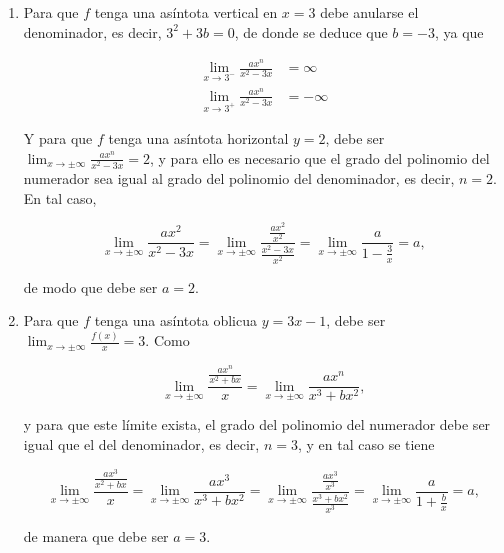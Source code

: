 \documentclass[
  spanish,
  a4paper,
]{scrreport}
\theoremstyle{definition}
\theoremstyle{remark}
\begin{document}
\begin{tcolorbox}[enhanced jigsaw, arc=.35mm, bottomrule=.15mm, bottomtitle=1mm, breakable, colback=white, colbacktitle=quarto-callout-tip-color!10!white, colframe=quarto-callout-tip-color-frame, coltitle=black, left=2mm, leftrule=.75mm, opacityback=0, opacitybacktitle=0.6, rightrule=.15mm, title=\textcolor{quarto-callout-tip-color}{\faLightbulb}\hspace{0.5em}{Solución}, titlerule=0mm, toprule=.15mm, toptitle=1mm]

\begin{enumerate}
\def\labelenumi{\alph{enumi}.}
\item
  Para que \(f\) tenga una asíntota vertical en \(x=3\) debe anularse el
  denominador, es decir, \(3^2+3b=0\), de donde se deduce que \(b=-3\),
  ya que

  \begin{align*}
  \lim_{x\to 3^-}\frac{ax^n}{x^2-3x}  
  &= \infty \\
  \lim_{x\to 3^+}\frac{ax^n}{x^2-3x}  
  &= -\infty
  \end{align*}

  Y para que \(f\) tenga una asíntota horizontal \(y=2\), debe ser
  \(\lim_{x\to \pm\infty} \frac{ax^n}{x^2-3x} = 2\), y para ello es
  necesario que el grado del polinomio del numerador sea igual al grado
  del polinomio del denominador, es decir, \(n=2\). En tal caso,

  \[
  \lim_{x\to \pm\infty} \frac{ax^2}{x^2-3x}
  = \lim_{x\to \pm\infty} \frac{\frac{ax^2}{x^2}}{\frac{x^2-3x}{x^2}}
  = \lim_{x\to \pm\infty} \frac{a}{1-\frac{3}{x}} 
  = a,
  \]

  de modo que debe ser \(a=2\).
\item
  Para que \(f\) tenga una asíntota oblicua \(y=3x-1\), debe ser
  \(\lim_{x\to\pm\infty} \frac{f(x)}{x}=3\). Como

  \[
  \lim_{x\to\pm\infty} \frac{\frac{ax^n}{x^2+bx}}{x} 
  = \lim_{x\to\pm\infty} \frac{ax^n}{x^3+bx^2},
  \]

  y para que este límite exista, el grado del polinomio del numerador
  debe ser igual que el del denominador, es decir, \(n=3\), y en tal
  caso se tiene

  \[
  \lim_{x\to\pm\infty} \frac{\frac{ax^3}{x^2+bx}}{x} 
  = \lim_{x\to\pm\infty} \frac{ax^3}{x^3+bx^2}
  = \lim_{x\to\pm\infty} \frac{\frac{ax^3}{x^3}}{\frac{x^3+bx^2}{x^3}}
  = \lim_{x\to\pm\infty} \frac{a}{1+\frac{b}{x}}
  = a,
  \]

  de manera que debe ser \(a=3\).


\end{enumerate}
\end{tcolorbox}
\end{document}

